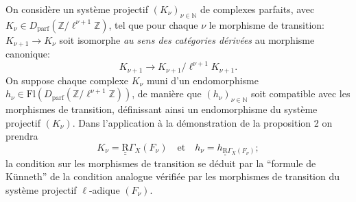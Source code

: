 On considère un système projectif $(K_\nu)_{\nu\in\mathbb{N}}$ de complexes parfaits, avec $K_\nu\in D_{\mathrm{parf}}(\mathbb{Z}/\ell^{\nu+1}\mathbb{Z})$, tel que pour chaque $\nu$ le
morphisme de transition: $K_{\nu+1}\to K_\nu$ soit isomorphe \emph{au sens des catégories dérivées} au morphisme canonique:
\[
K_{\nu+1}\to K_{\nu+1}/\ell^{\nu+1}K_{\nu+1}.
\]
On suppose chaque complexe $K_\nu$ muni d'un endomorphisme $h_\nu\in\mathrm{Fl}(D_{\mathrm{parf}}(\mathbb{Z}/\ell^{\nu+1}\mathbb{Z}))$, de manière que $(h_\nu)_{\nu\in\mathbb{N}}$ soit compatible avec les morphismes de transition, définissant ainsi un endomorphisme du système projectif $(K_\nu)$. Dans l'application à la démonstration de la proposition 2 on prendra
\[
K_\nu=\underline{\underline{\mathrm{R}}}\Gamma_X(F_\nu)\quad\text{et}\quad h_\nu=h_{\underline{\underline{\mathrm{R}}}\Gamma_X(F_\nu)};
\]
la condition sur les morphismes de transition se déduit par la ``formule de Künneth'' de la condition analogue vérifiée par les morphismes de transition du système projectif $\ell$-adique $(F_\nu)$.

